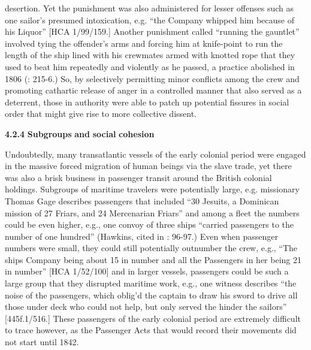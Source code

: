 desertion.  Yet the punishment was also administered for lesser offenses such as one sailor’s presumed intoxication, e.g. “the Company whipped him because of his Liquor” [HCA 1/99/159.] Another punishment called “running the gauntlet” involved tying the offender’s arms and forcing him at knife-point to run the length of the ship lined with his crewmates armed with knotted rope that they used to beat him repeatedly and violently as he passed, a practice abolished in 1806 (\citealt{AdkinsAdkins2008}: 215-6.) So, by selectively permitting minor conflicts among the crew and promoting cathartic release of anger in a controlled manner that also served as a deterrent, those in authority were able to patch up potential fissures in social order that might give rise to more collective dissent. 

\textbf{4.2.4} \textbf{Subgroups} \textbf{and} \textbf{social} \textbf{cohesion}

  Undoubtedly, many transatlantic vessels of the early colonial period were engaged in the massive forced migration of human beings via the slave trade, yet there was also a brisk business in passenger transit around the British colonial holdings. Subgroups of maritime travelers were potentially large, e.g. missionary Thomas Gage describes passengers that included “30 Jesuits, a Dominican mission of 27 Friars, and 24 Mercenarian Friars” \citep[15,]{Gage1648} and among a fleet the numbers could be even higher, e.g., one convoy of three ships “carried passengers to the number of one hundred” (Hawkins, cited in \citealt{Bicheno2012}: 96-97.) Even when passenger numbers were small, they could still potentially outnumber the crew, e.g., “The ships Company being about 15 in number and all the Passengers in her being 21 in number” [HCA 1/52/100] and in larger vessels, passengers could be such a large group that they disrupted maritime work, e.g., one witness describes “the noise of the passengers, which oblig’d the captain to draw his sword to drive all those under deck who could not help, but only served the hinder the sailors” [445f.1/516.] These passengers of the early colonial period are extremely difficult to trace however, as the Passenger Acts that would record their movements did not start until 1842.

